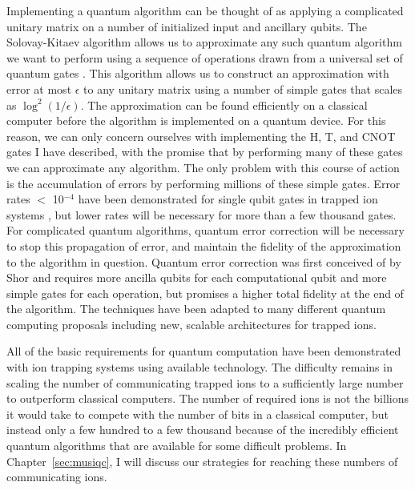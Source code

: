 Implementing a quantum algorithm can be thought of as applying a complicated unitary matrix on a number of initialized input and ancillary qubits.  The Solovay-Kitaev algorithm allows us to approximate any such quantum algorithm we want to perform using a sequence of operations drawn from a universal set of quantum gates \cite{Dawson:06}.  This algorithm allows us to construct an approximation with error at most $\epsilon$ to any unitary matrix using a number of simple gates that scales as $\log^2(1 / \epsilon )$.  The approximation can be found efficiently on a classical computer before the algorithm is implemented on a quantum device.  For this reason, we can only concern ourselves with implementing the H, T, and CNOT gates I have described, with the promise that by performing many of these gates we can approximate any algorithm.  The only problem with this course of action is the accumulation of errors by performing millions of these simple gates.  Error rates $<$ 10$^{-4}$ have been demonstrated for single qubit gates in trapped ion systems \cite{Brown:11}, but lower rates will be necessary for more than a few thousand gates.  For complicated quantum algorithms, quantum error correction will be necessary to stop this propagation of error, and maintain the fidelity of the approximation to the algorithm in question.  Quantum error correction was first conceived of by Shor and requires more ancilla qubits for each computational qubit and more simple gates for each operation, but promises a higher total fidelity at the end of the algorithm\cite{Shor:95}.  The techniques have been adapted to many different quantum computing proposals including new, scalable architectures for trapped ions\cite{Oi:06}.

All of the basic requirements for quantum computation have been demonstrated with ion trapping systems using available technology.  The difficulty remains in scaling the number of communicating trapped ions to a sufficiently large number to outperform classical computers.  The number of required ions is not the billions it would take to compete with the number of bits in a classical computer, but instead only a few hundred to a few thousand because of the incredibly efficient quantum algorithms that are available for some difficult problems.  In Chapter~\ref{sec:musiqc}, I will discuss our strategies for reaching these numbers of communicating ions.


